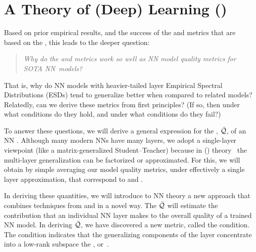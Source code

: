 \section{A \SemiEmpirical Theory of (Deep) Learning (\SETOL)}
\label{sxn:setol}
Based on prior empirical results, and the success of the \ALPHA and \ALPHAHAT metrics that are based on the \HTSR \Phenomenology, this leads to the deeper question: 
%
\begin{quote}
\emph{Why do the \ALPHA and \ALPHAHAT metrics work so well as NN model quality metrics for SOTA NN~models?}
\end{quote}
That is, why do NN models with heavier-tailed layer Empirical Spectral Distributions  (ESDs) tend to generalize better when compared to related models?
Relatedly, can we derive these metrics from first principles?
(If so, then under what conditions do they hold, and under what conditions do they fail?)


To answer these questions, we will derive a general expression for the \LayerQuality, $\bar{\mathcal{Q}}$, of an NN .
Although many modern NNs have many layers, we adopt a single-layer viewpoint (like a matrix-generalized Student–Teacher) because in \StatisticalMechanicsOfGeneralization (\SMOG) theory~\cite{SST92,STS90} the multi-layer generalization can be factorized or approximated.
For this, we will obtain by simple averaging our model quality metrics, under effectively a single layer approximation, that correspond to \ALPHA and \ALPHAHAT.


In deriving these quantities, we will introduce to NN theory a new \SemiEmpirical approach that combines techniques from \STATMECH and \RMT in a novel way. 
The \LayerQuality $\bar{\mathcal{Q}}$ will estimate the contribution that an individual NN layer makes to the overall quality of a trained NN model.
In deriving $\bar{\mathcal{Q}}$, we have discovered a new \LayerQuality metric,  called the \TRACELOG condition. The \TRACELOG condition indicates that the generalizing components of the layer  concentrate into a low-rank subspace the \emph{\EffectiveCorrelationSpace}, or~\ECS. 

